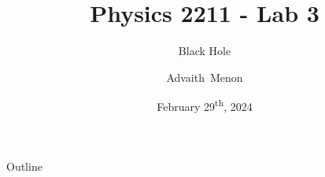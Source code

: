 \documentclass{beamer}
\title[PHYS-2211-Lab03] %
{Physics 2211 - Lab 3}
\subtitle
{Black Hole} %
\author[Menon, Advaith] %
{Advaith~Menon\inst{1}}
\institute%
{
  \inst{1}%
  Computer Engineering\\
  Georgia Institute of Technology
  }
\date%
{February 29\textsuperscript{th}, 2024}
\begin{document}
\begin{frame}
  \titlepage
\end{frame}

\begin{frame}{Outline}
  \tableofcontents
\end{frame}









\end{document}
